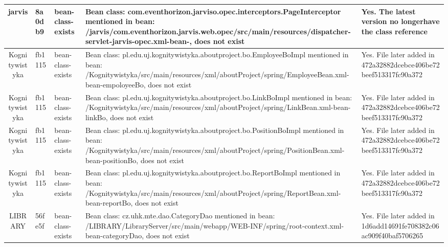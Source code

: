 \begin{longtable}{|c|l|l|p{6cm}|p{3cm}|}
\hline
jarvis & 8a0db9 & bean-class-exists & Bean class: com.eventhorizon.jarviso.op\allowbreak ec.interceptors.PageInterceptor mentione\allowbreak d in bean: /jarvis/com.eventhorizon.jarv\allowbreak is.web.opec/src/main/resources/dispatche\allowbreak r-servlet-jarvis-opec.xml-bean-, does no\allowbreak t exist & Yes. The latest \allowbreak version no longer\allowbreak  have the class r\allowbreak eference \\
\hline
Kognitywistyka & fb1115 & bean-class-exists & Bean class: pl.edu.uj.kognitywistyka.ab\allowbreak outproject.bo.EmployeeBoImpl mentioned i\allowbreak n bean: /Kognitywistyka/src/main/resourc\allowbreak es/xml/aboutProject/spring/EmployeeBean.\allowbreak xml-bean-empoloyeeBo, does not exist & Yes. File later \allowbreak added in 472a3288\allowbreak 2dcebce406be72bee\allowbreak f513317fc90a372 \\
\hline
Kognitywistyka & fb1115 & bean-class-exists & Bean class: pl.edu.uj.kognitywistyka.aboutpr\allowbreak oject.bo.LinkBoImpl mentioned in bean: /Kogni\allowbreak tywistyka/src/main/resources/xml\allowbreak /aboutProject/spring/LinkBean.xml-bean-linkBo, does not ex\allowbreak ist & Yes. File later add\allowbreak ed in 472a32882dcebc\allowbreak e406be72beef51331\allowbreak 7fc90a372 \\
\hline
Kognitywistyka & fb1115 & bean-class-exists & Bean class: pl.edu.uj.kognitywistyka.ab\allowbreak outproject.bo.PositionBoImpl mentioned i\allowbreak n bean: /Kognitywistyka/src/main/resourc\allowbreak es/xml/aboutProject/spring/PositionBean.\allowbreak xml-bean-positionBo, does not exist & Yes. File later \allowbreak added in 472a3288\allowbreak 2dcebce406be72bee\allowbreak f513317fc90a372 \\
\hline
Kognitywistyka & fb1115 & bean-class-exists & Bean class: pl.edu.uj.kognitywistyka.ab\allowbreak outproject.bo.ReportBoImpl mentioned in \allowbreak bean: /Kognitywistyka/src/main/resources\allowbreak /xml/aboutProject/spring/ReportBean.xml-\allowbreak bean-reportBo, does not exist & Yes. File later \allowbreak added in 472a3288\allowbreak 2dcebce406be72bee\allowbreak f513317fc90a372 \\
\hline
LIBRARY & 56fe5f & bean-class-exists & Bean class: cz.uhk.mte.dao.CategoryDao \allowbreak mentioned in bean: /LIBRARY/LibraryServe\allowbreak r/src/main/webapp/WEB-INF/spring/root-co\allowbreak ntext.xml-bean-categoryDao, does not exi\allowbreak st & Yes. File later \allowbreak added in 1d6add14\allowbreak 691fe708382c06ac9\allowbreak 09f40baf5706265 \\

\end{longtable}
